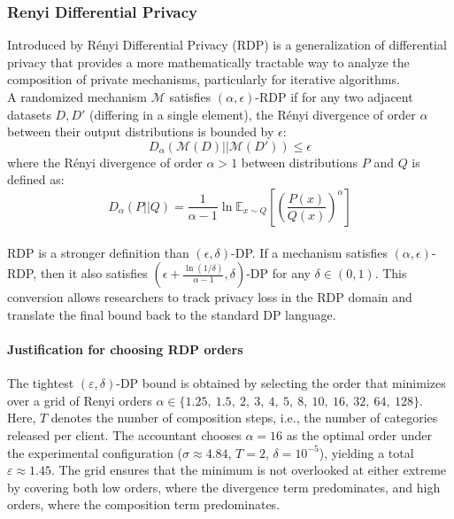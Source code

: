 \documentclass{article}
\begin{document}
\subsubsection{Renyi Differential Privacy}
\label{sec:rdp_results}
Introduced by \citep{Mironov_2017} Rényi Differential Privacy (RDP) is a generalization of differential privacy that provides a more mathematically tractable way to analyze the composition of private mechanisms, particularly for iterative algorithms.
 \\
A randomized mechanism $\mathcal{M}$ satisfies $(\alpha, \epsilon)$-RDP if for any two adjacent datasets $D, D'$ (differing in a single element), the Rényi divergence of order $\alpha$ between their output distributions is bounded by
      $\epsilon$:
   \begin{equation}
   D_\alpha(\mathcal{M}(D) || \mathcal{M}(D')) \le \epsilon
   \end{equation}
where the Rényi divergence of order $\alpha > 1$ between distributions $P$ and $Q$ is defined as:
 \begin{equation}
     D_\alpha(P || Q) = \frac{1}{\alpha - 1} \ln \mathbb{E}_{x \sim Q} \left[ \left( \frac{P(x)}{Q(x)} \right)^\alpha \right]
 \end{equation}
 \\
 RDP is a stronger definition than $(\epsilon, \delta)$-DP. If a mechanism satisfies $(\alpha, \epsilon)$-RDP, then it also satisfies $\left(\epsilon + \frac{\ln(1/\delta)}{\alpha-1}, \delta\right)$-DP for any $\delta \in (0, 1)$. This conversion allows researchers to track privacy loss in the RDP domain and translate the final bound back to the standard DP language.

\paragraph*{Justification for choosing RDP orders}

The tightest $(\varepsilon, \delta)$-DP bound is obtained by selecting the order that minimizes over a grid of Renyi orders $\alpha \in \{1.25,\ 1.5,\ 2,\ 3,\ 4,\ 5,\ 8,\ 10,\ 16,\ 32,\ 64,\ 128\}$. Here, $T$ denotes the number of composition steps, i.e., the number of categories released per client. The accountant chooses $\alpha = 16$ as the optimal order under the experimental configuration ($\sigma \approx 4.84$, $T = 2$, $\delta = 10^{-5}$), yielding a total $\varepsilon \approx 1.45$. The grid ensures that the minimum is not overlooked at either extreme by covering both low orders, where the divergence term predominates, and high orders, where the composition term predominates.
 
\end{document}
